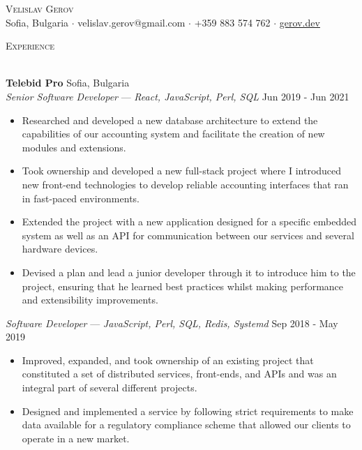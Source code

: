 \documentclass[a4paper]{article}
\newcommand{\lineunder} {
    \vspace*{-8pt} \\
    \hspace*{-18pt} \hrulefill \\
}
\newcommand{\header} [1] {
    {\hspace*{-18pt}\vspace*{6pt} \textsc{#1}}
    \vspace*{-6pt} \lineunder
}
\begin{document}
\vspace*{-40pt}

    

\vspace*{-10pt}
\begin{center}
	{\Huge \scshape {Velislav Gerov}}\\
	Sofia, Bulgaria $\cdot$ velislav.gerov@gmail.com $\cdot$ +359 883 574 762 $\cdot$  \href{https://gerov.dev}{\underline{gerov.dev}}\\
\end{center}

\header{Experience}
\vspace{1mm}

\textbf{Telebid Pro} \hfill Sofia, Bulgaria\\
\textit{Senior Software Developer}  — {\sl React, JavaScript, Perl, SQL}  \hfill Jun 2019 - Jun 2021\\
\vspace{-1mm}
\begin{itemize} \itemsep 1pt
	\item Researched and developed a new database architecture to extend the capabilities of our accounting system and facilitate the creation of new modules and extensions.
	\item Took ownership and developed a new full-stack project where I introduced new front-end technologies to develop reliable accounting interfaces that ran in fast-paced environments.
	\item Extended the project with a new application designed for a specific embedded system as well as an API for communication between our services and several hardware devices.
	\item Devised a plan and lead a junior developer through it to introduce him to the project, ensuring that he learned best practices whilst making performance and extensibility improvements.
\end{itemize}

\textit{Software Developer}  — {\sl JavaScript, Perl, SQL, Redis, Systemd} \hfill Sep 2018 - May 2019\\
\vspace{-1mm}
\begin{itemize} \itemsep 1pt
	\item Improved, expanded, and took ownership of an existing project that constituted a set of distributed services, front-ends, and APIs and was an integral part of several different projects.
	\item Designed and implemented a service by following strict requirements to make data available for a regulatory compliance scheme that allowed our clients to operate in a new market.
\end{itemize}
\end{document}
